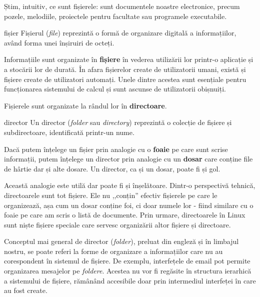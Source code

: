Știm, intuitiv, ce sunt fișierele: sunt documentele noastre electronice, precum pozele, melodiile, proiectele pentru facultate sau programele executabile.

\begin{definition}{fișier}
Fișierul (\textit{file}) reprezintă o formă de organizare digitală a informațiilor, având forma unei înșiruiri de octeți.
\end{definition}

Informațiile sunt organizate în \textbf{fișiere} în vederea utilizării lor printr-o aplicație și a stocării lor de durată.
În afara fișierelor create de utilizatorii umani, există și fișiere create de utilizatori automați.
Unele dintre acestea sunt esențiale pentru funcționarea sistemului de calcul și sunt ascunse de utilizatorii obișnuiți.

Fișierele sunt organizate la rândul lor în \textbf{directoare}.

\begin{definition}{director}
Un director (\textit{folder} sau \textit{directory}) reprezintă o colecție de fișiere și subdirectoare, identificată printr-un nume.
\end{definition}

Dacă putem înțelege un fișier prin analogie cu o \textbf{foaie} pe care sunt scrise informații, putem înțelege un director prin analogie cu un \textbf{dosar} care conține file de hârtie dar și alte dosare.
Un director, ca și un dosar, poate fi și gol.

Această analogie este utilă dar poate fi și înșelătoare.
Dintr-o perspectivă tehnică, directoarele sunt tot fișiere.
Ele nu ,,conțin'' efectiv fișierele pe care le organizează, așa cum un dosar conține foi, ci doar numele lor - fiind similare cu o foaie pe care am scris o listă de documente.
Prin urmare, directoarele în Linux sunt niște fișiere speciale care servesc
organizării altor fișiere și directoare.

\begin{note}
Conceptul mai general de director (\textit{folder}), preluat din engleză și în limbajul nostru, se poate referi la forme de organizare a informațiilor care nu au corespondent în sistemul de fișiere.
De exemplu, interfețele de email pot permite organizarea mesajelor pe \textit{foldere}.
Acestea nu vor fi regăsite în structura ierarhică a sistemului de fișiere, rămânând accesibile doar prin intermediul interfeței în care au fost create.
\end{note}

